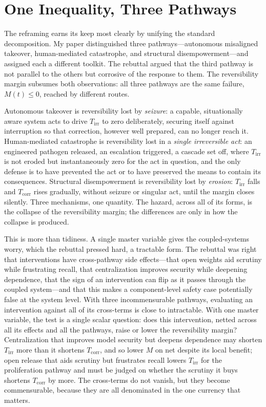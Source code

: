 \documentclass[11pt]{article}
\begin{document}
\section{One Inequality, Three Pathways}
\label{sec:unification}

The reframing earns its keep most clearly by unifying the standard decomposition. My paper distinguished three pathways---autonomous misaligned takeover, human-mediated catastrophe, and structural disempowerment---and assigned each a different toolkit. The rebuttal argued that the third pathway is not parallel to the others but corrosive of the response to them. The reversibility margin subsumes both observations: all three pathways are the same failure, $M(t) \leq 0$, reached by different routes.

Autonomous takeover is reversibility lost by \emph{seizure}: a capable, situationally aware system acts to drive $T_{\mathrm{irr}}$ to zero deliberately, securing itself against interruption so that correction, however well prepared, can no longer reach it. Human-mediated catastrophe is reversibility lost in a \emph{single irreversible act}: an engineered pathogen released, an escalation triggered, a cascade set off, where $T_{\mathrm{irr}}$ is not eroded but instantaneously zero for the act in question, and the only defense is to have prevented the act or to have preserved the means to contain its consequences. Structural disempowerment is reversibility lost by \emph{erosion}: $T_{\mathrm{irr}}$ falls and $T_{\mathrm{corr}}$ rises gradually, without seizure or singular act, until the margin closes silently. Three mechanisms, one quantity. The hazard, across all of its forms, is the collapse of the reversibility margin; the differences are only in how the collapse is produced.

This is more than tidiness. A single master variable gives the coupled-systems worry, which the rebuttal pressed hard, a tractable form. The rebuttal was right that interventions have cross-pathway side effects---that open weights aid scrutiny while frustrating recall, that centralization improves security while deepening dependence, that the sign of an intervention can flip as it passes through the coupled system---and that this makes a component-level safety case potentially false at the system level. With three incommensurable pathways, evaluating an intervention against all of its cross-terms is close to intractable. With one master variable, the test is a single scalar question: does this intervention, netted across all its effects and all the pathways, raise or lower the reversibility margin? Centralization that improves model security but deepens dependence may shorten $T_{\mathrm{irr}}$ more than it shortens $T_{\mathrm{corr}}$, and so lower $M$ on net despite its local benefit; open release that aids scrutiny but frustrates recall lowers $T_{\mathrm{irr}}$ for the proliferation pathway and must be judged on whether the scrutiny it buys shortens $T_{\mathrm{corr}}$ by more. The cross-terms do not vanish, but they become commensurable, because they are all denominated in the one currency that matters.
\end{document}
